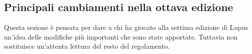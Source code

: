 \documentclass[a4paper,10pt]{article}
\begin{document}

\subsection{Principali cambiamenti nella ottava edizione} %

Questa sezione è pensata per dare a chi ha giocato alla settima edizione di Lupus un'idea delle modifiche più importanti che sono state apportate. Tuttavia non sostituisce un'attenta lettura del resto del regolamento.
\end{document}
